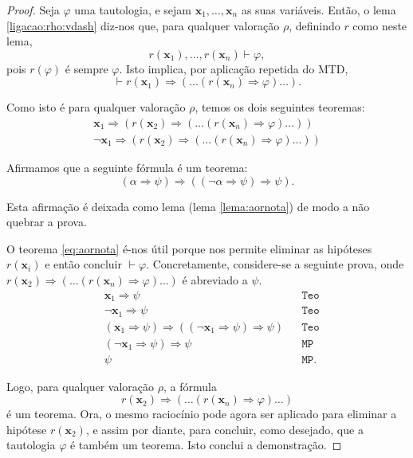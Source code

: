 \documentclass{report}
\theoremstyle{definition}
\theoremstyle{remark}
\renewcommand{\bf}[1]{\mathbf{#1}}
\newcommand{\imply}{\mathbin{\Rightarrow}}
\begin{document}
	\begin{proof}
	Seja $\varphi$ uma tautologia, e sejam $\bf x_1, \dots, \bf x_n$ as suas variáveis. Então, o lema \ref{ligacao:rho:vdash} diz-nos que, para qualquer valoração $\rho$, definindo $r$ como neste lema,
	\[r(\bf x_1), \dots, r(\bf x_n) \vdash \varphi,\]
	pois $r(\varphi)$ é sempre $\varphi$. Isto implica, por aplicação repetida do MTD,
	\[\vdash r(\bf x_1) \imply ( \dots (r(\bf x_n) \imply \varphi) \dots ).\]
	
	Como isto é para qualquer valoração $\rho$, temos os dois seguintes teoremas:
	\begin{gather*}
	\bf x_1 \imply ( r(\bf x_2) \imply (\dots (r(\bf x_n) \imply \varphi) \dots ))\\
	\neg \bf x_1 \imply ( r(\bf x_2) \imply (\dots (r(\bf x_n) \imply \varphi) \dots ))
	\end{gather*}
	
	Afirmamos que a seguinte fórmula é um teorema:
	\begin{equation}\label{eq:aornota}
	(\alpha \imply \psi) \imply ((\neg \alpha \imply \psi) \imply \psi).
	\end{equation}
	
	Esta afirmação é deixada como lema (lema \ref{lema:aornota}) de modo a não quebrar a prova.
	
	O teorema \eqref{eq:aornota} é-nos útil porque nos permite eliminar as hipóteses $r(\bf x_i)$ e então concluir $\vdash \varphi$. Concretamente, considere-se a seguinte prova, onde $r(\bf x_2) \imply (\dots (r(\bf x_n) \imply \varphi) \dots )$ é abreviado a $\psi$.
	\begin{align*}
	&\bf x_1 \imply \psi&&\texttt{Teo}\\
	&\neg \bf x_1 \imply \psi&&\texttt{Teo}\\
	&(\bf x_1 \imply \psi) \imply ((\neg \bf x_1 \imply \psi) \imply \psi)&&\texttt{Teo}\\
	&(\neg \bf x_1 \imply \psi) \imply \psi&&\texttt{MP}\\
	&\psi&&\texttt{MP}.
	\end{align*}
	
	Logo, para qualquer valoração $\rho$, a fórmula
	\[r(\bf x_2) \imply (\dots (r(\bf x_n) \imply \varphi) \dots )\]
	é um teorema. Ora, o mesmo raciocínio pode agora ser aplicado para eliminar a hipótese $r(\bf x_2)$, e assim por diante, para concluir, como desejado, que a tautologia $\varphi$ é também um teorema. Isto conclui a demonstração.
	\end{proof}
	
\end{document}

